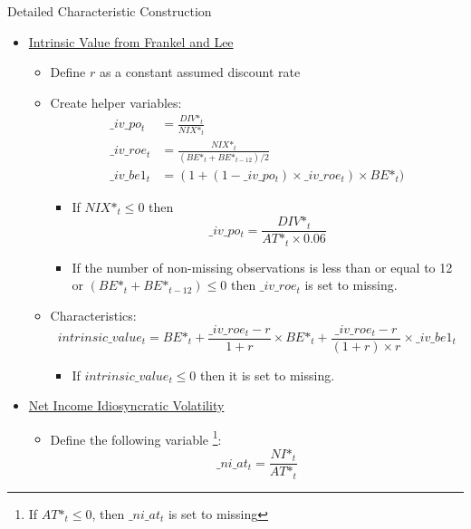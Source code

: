 \documentclass[12pt,title,fleqn]{article}
\begin{document}
\begin{section}{Detailed Characteristic Construction}
\begin{itemize}
        \item \hyperlink{intval2}{\hypertarget{intval}{Intrinsic Value from Frankel and Lee}}
            \begin{itemize}
                \item Define $r$ as a constant assumed discount rate
                \item Create helper variables:
                    \begin{align*}
                        \_iv\_po_t &= \frac{DIV\mbox{*}_t}{NIX\mbox{*}_t} \\
                        \_iv\_roe_t &= \frac{NIX\mbox{*}_t}{(BE\mbox{*}_t + BE\mbox{*}_{t-12})/2} \\
                        \_iv\_be1_t &= (1 + (1 - \_iv\_po_t) \times \_iv\_roe_t) \times BE\mbox{*}_t)
                    \end{align*}
                    \begin{itemize}
                        \item If $NIX\mbox{*}_t \leq 0$ then 
                            \begin{equation*}
                                \_iv\_po_t = \frac{DIV\mbox{*}_t}{AT\mbox{*}_t \times 0.06}
                            \end{equation*}
                        \item If the number of non-missing observations is less than or equal to 12 or $(BE\mbox{*}_t + BE\mbox{*}_{t-12}) \leq 0$ then $\_iv\_roe_t$ is set to missing. 
                    \end{itemize}
                    
                \item Characteristics: 
                    \begin{equation*}
                        intrinsic\_value_t = BE\mbox{*}_t + \frac{\_iv\_roe_t - r}{1 + r} \times BE\mbox{*}_t + \frac{\_iv\_roe_t - r}{(1 + r)\times r} \times \_iv\_be1_t
                    \end{equation*}
                    \begin{itemize}
                        \item If $intrinsic\_value_t \leq 0$ then it is set to missing.
                    \end{itemize}
            \end{itemize}
            
        \item \hyperlink{ni_ivol2}{\hypertarget{ni_ivol}{Net Income Idiosyncratic Volatility}}
            \begin{itemize}
                \item Define the following variable \footnote{If $AT\mbox{*}_t\leq 0$, then $\_ni\_at_t$ is set to missing}:
                        \begin{equation*}
                            \_ni\_at_t = \frac{NI\mbox{*}_t}{AT\mbox{*}_t}
                        \end{equation*}
                    

\end{itemize}
\end{itemize}
\end{section}
\end{document}
